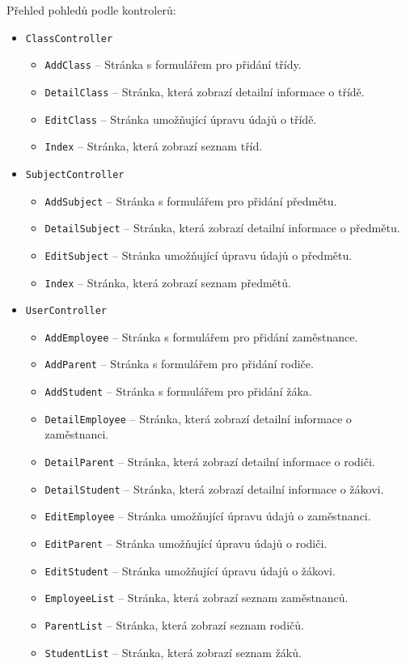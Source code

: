 Přehled pohledů podle kontrolerů:
\begin{itemize}
    \item \texttt{ClassController}
    \begin{itemize}
        \item \texttt{AddClass} -- Stránka s formulářem pro přidání třídy.
        \item \texttt{DetailClass} -- Stránka, která zobrazí detailní informace o třídě.
        \item \texttt{EditClass} -- Stránka umožňující úpravu údajů o třídě.
        \item \texttt{Index} -- Stránka, která zobrazí seznam tříd.
    \end{itemize}
    
    \item \texttt{SubjectController}
    \begin{itemize}
        \item \texttt{AddSubject} -- Stránka s formulářem pro přidání předmětu.
        \item \texttt{DetailSubject} -- Stránka, která zobrazí detailní informace o předmětu.
        \item \texttt{EditSubject} -- Stránka umožňující úpravu údajů o předmětu.
        \item \texttt{Index} -- Stránka, která zobrazí seznam předmětů.
    \end{itemize}
    
    \item \texttt{UserController}
    \begin{itemize}
        \item \texttt{AddEmployee} -- Stránka s formulářem pro přidání zaměstnance.
        \item \texttt{AddParent} -- Stránka s formulářem pro přidání rodiče.
        \item \texttt{AddStudent} -- Stránka s formulářem pro přidání žáka.
        \item \texttt{DetailEmployee} -- Stránka, která zobrazí detailní informace o zaměstnanci.
        \item \texttt{DetailParent} -- Stránka, která zobrazí detailní informace o rodiči.
        \item \texttt{DetailStudent} -- Stránka, která zobrazí detailní informace o žákovi.
        \item \texttt{EditEmployee} -- Stránka umožňující úpravu údajů o zaměstnanci.
        \item \texttt{EditParent} -- Stránka umožňující úpravu údajů o rodiči.
        \item \texttt{EditStudent} -- Stránka umožňující úpravu údajů o žákovi.
        \item \texttt{EmployeeList} -- Stránka, která zobrazí seznam zaměstnanců.
        \item \texttt{ParentList} -- Stránka, která zobrazí seznam rodičů.
        \item \texttt{StudentList} -- Stránka, která zobrazí seznam žáků.
    \end{itemize}
\end{itemize}


